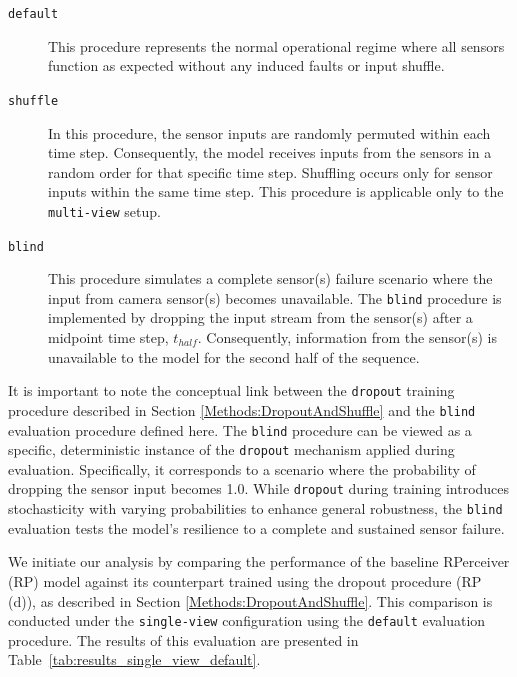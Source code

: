 \begin{description}
    \item[\texttt{default}] This procedure represents the normal operational regime where all sensors function as expected without any induced faults or input shuffle.

    \item[\texttt{shuffle}] In this procedure, the sensor inputs are randomly permuted within each time step. Consequently, the model receives inputs from the sensors in a random order for that specific time step. Shuffling occurs only for sensor inputs within the same time step. This procedure is applicable only to the \texttt{multi-view} setup.

    \item[\texttt{blind}] This procedure simulates a complete sensor(s) failure scenario where the input from camera sensor(s) becomes unavailable. The \texttt{blind} procedure is implemented by dropping the input stream from the sensor(s) after a midpoint time step, $t_{half}$. Consequently, information from the sensor(s) is unavailable to the model for the second half of the sequence.
\end{description}

It is important to note the conceptual link between the \texttt{dropout} training procedure described in Section \ref{Methods:DropoutAndShuffle} and the \texttt{blind} evaluation procedure defined here. The \texttt{blind} procedure can be viewed as a specific, deterministic instance of the \texttt{dropout} mechanism applied during evaluation. Specifically, it corresponds to a scenario where the probability of dropping the sensor input becomes 1.0. While \texttt{dropout} during training introduces stochasticity with varying probabilities to enhance general robustness, the \texttt{blind} evaluation tests the model's resilience to a complete and sustained sensor failure.

We initiate our analysis by comparing the performance of the baseline RPerceiver (RP) model against its counterpart trained using the dropout procedure (RP (d)), as described in Section \ref{Methods:DropoutAndShuffle}. This comparison is conducted under the \texttt{single-view} configuration using the \texttt{default} evaluation procedure. The results of this evaluation are presented in Table~\ref{tab:results_single_view_default}.

